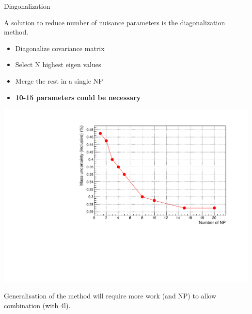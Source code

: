 \documentclass[a4paper]{beamer}
\begin{document}
  \begin{frame}{Diagonalization}
    \begin{minipage}{0.49\linewidth}
    A solution to reduce number of nuisance parameters is the diagonalization method.
    \begin{itemize}
    \item Diagonalize covariance matrix
    \item Select N highest eigen values
    \item Merge the rest in a single NP
    \item {\bf 10-15 parameters could be necessary}
    \end{itemize}
    \end{minipage}
    \hfill
    \begin{minipage}{0.49\linewidth}
      \includegraphics[width=\linewidth]{plots/170109_Unal_uncertainty_np.pdf}
    \end{minipage}
    \vfill
    Generalisation of the method will require more work (and NP) to allow combination (with 4l).
  \end{frame}
\end{document}
